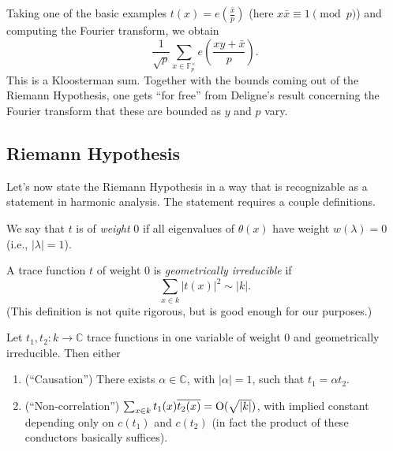 \documentclass[reqno]{amsart} 
\numberwithin{theorem}{section}
\numberwithin{equation}{section}
\begin{document}
\begin{example}
  Taking one of the basic examples $t(x) = e(\tfrac{\bar{x}}{p})$ (here $x \bar{x} \equiv 1 \pmod{p}$) and computing the Fourier transform, we obtain
  \begin{equation*}
    \frac{1}{\sqrt{p}}
    \sum_{x \in \mathbb{F}_p^\times}
    e \left( \frac{x y + \bar{x}}{p} \right).
  \end{equation*}
  This is a Kloosterman sum.  Together with the bounds coming out of the Riemann Hypothesis, one gets ``for free'' from Deligne's result concerning the Fourier transform that these are bounded as $y$ and $p$ vary.
\end{example}

\subsection{Riemann Hypothesis}

Let's now state the Riemann Hypothesis in a way that is recognizable as a statement in harmonic analysis.  The statement requires a couple definitions.

\begin{definition}
  We say that $t$ is of \emph{weight} $0$ if all eigenvalues of $\theta(x)$ have weight $w(\lambda) = 0$ (i.e., $\lvert \lambda \rvert = 1$).
\end{definition}

\begin{definition}
  A trace function $t$ of weight $0$ is \emph{geometrically irreducible} if
  \begin{equation*}
    \sum_{x \in k} \lvert t(x) \rvert^2 \sim \lvert k \rvert.
  \end{equation*}
  (This definition is not quite rigorous, but is good enough for our purposes.)
\end{definition}

\begin{theorem}[Deligne, 1981]
  Let $t_1, t_2 : k \rightarrow \mathbb{C}$ trace functions in one variable of weight $0$ and geometrically irreducible.  Then either
  \begin{enumerate}
  \item (``Causation'') There exists $\alpha \in \mathbb{C}$, with $\lvert \alpha \rvert = 1$, such that $t_1 = \alpha t_2$.
  \item (``Non-correlation'') $\sum_{x \in k} t_1(x) \overline{t_2(x)} = \operatorname{O}(\sqrt{\lvert k \rvert})$, with implied constant depending only on $c(t_1)$ and $c(t_2)$ (in fact the product of these conductors basically suffices).
  \end{enumerate}
\end{theorem}
\end{document}
